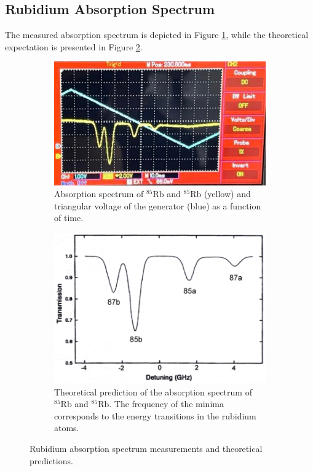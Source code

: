 \subsection{Rubidium Absorption Spectrum}
The measured absorption spectrum is depicted in Figure \ref{fig:spectrum_1}, 
while the theoretical expectation is presented in Figure \ref{fig:spectrum_2}.
\begin{figure}
    \centering
    \begin{subfigure}{0.45\textwidth}
      \centering
      \includegraphics[width=\textwidth]{pictures/Spektrum.jpeg}
      \caption{Absorption spectrum of $^{85}\text{Rb}$ and $^{85}\text{Rb}$ (yellow) and triangular voltage of the generator (blue) as a function of time.}
      \label{fig:spectrum_1}
    \end{subfigure}
    \hfill
    \begin{subfigure}{0.45\textwidth}
      \centering
      \includegraphics[width=\textwidth]{pictures/Theoriespektrum.png}
      \caption{Theoretical prediction of the absorption spectrum of $^{85}\text{Rb}$ and $^{85}\text{Rb}$. The frequency of the minima corresponds to the energy transitions in the rubidium atoms. \cite{satabs1}}
      \label{fig:spectrum_2}
    \end{subfigure}
    \caption{Rubidium absorption spectrum measurements and theoretical predictions.}
    \label{fig:spectrum}
\end{figure}
